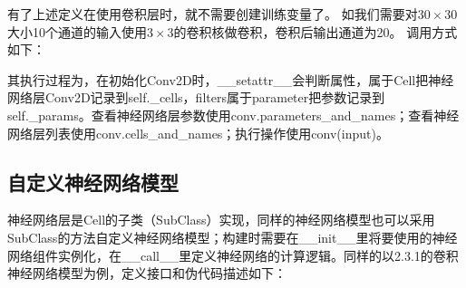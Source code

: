 \documentclass[letterpaper,10pt,english]{sphinxmanual}
\begin{document}
\sphinxAtStartPar
有了上述定义在使用卷积层时，就不需要创建训练变量了。
如我们需要对\(30 \times 30\)大小10个通道的输入使用\(3 \times 3\)的卷积核做卷积，卷积后输出通道为20。
调用方式如下：

\begin{sphinxVerbatim}[commandchars=\\\{\}]
      
  
\end{sphinxVerbatim}

\sphinxAtStartPar
其执行过程为，在初始化Conv2D时，\_\_setattr\_\_会判断属性，属于Cell把神经网络层Conv2D记录到self.\_cells，filters属于parameter把参数记录到self.\_params。查看神经网络层参数使用conv.parameters\_and\_names；查看神经网络层列表使用conv.cells\_and\_names；执行操作使用conv(input)。


\subsection{自定义神经网络模型}
\label{\detokenize{chapter_programming_interface/neural_network_layer:id5}}
\sphinxAtStartPar
神经网络层是Cell的子类（SubClass）实现，同样的神经网络模型也可以采用SubClass的方法自定义神经网络模型；构建时需要在\_\_init\_\_里将要使用的神经网络组件实例化，在\_\_call\_\_里定义神经网络的计算逻辑。同样的以2.3.1的卷积神经网络模型为例，定义接口和伪代码描述如下：
\end{document}
